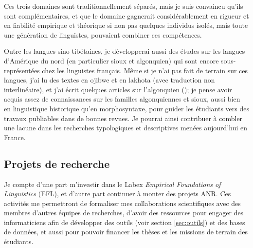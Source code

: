 \documentclass[oldfontcommands,oneside,a4paper,11pt]{article}
\begin{document}
Ces trois domaines sont traditionnellement séparés, mais je suis convaincu qu'ils sont complémentaires, et que le domaine gagnerait considérablement en rigueur et en fiabilité empirique et théorique si non pas quelques individus isolés, mais toute une génération de linguistes, pouvaient combiner ces compétences.


Outre les langues sino-tibétaines, je développerai aussi des études sur les langues d'Amérique du nord (en particulier sioux et algonquien) qui sont encore sous-représentées chez les linguistes français. Même si je n'ai pas fait de terrain sur ces langues, j'ai lu des textes en ojibwe et en lakhota (avec traduction non interlinéaire), et j'ai écrit quelques articles sur l'algonquien (\citealt{jacques12bear, jacques13arapaho, jacques15directionality}); je pense avoir acquis assez de connaissances sur les familles algonquiennes et sioux, aussi bien en linguistique historique qu'en morphosyntaxe, pour guider les étudiants vers des travaux publiables dans de bonnes revues. Je pourrai ainsi contribuer à combler une lacune dans les recherches typologiques et descriptives menées aujourd'hui en France.

\subsection{Projets de recherche}
Je compte d'une part m'investir dans le Labex \textit{Empirical Foundations of Linguistics} (EFL), et d'autre part continuer à monter des projets ANR. Ces activités me permettront de formaliser mes collaborations scientifiques avec des membres d'autres équipes de recherches, d'avoir des ressources pour engager des informaticiens afin de développer des outils (voir section \ref{sec:outils}) et des bases de données, et aussi pour pouvoir financer les thèses et les missions de terrain des étudiants.
\end{document}

